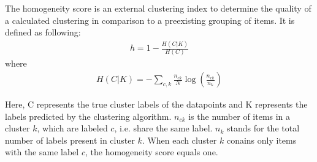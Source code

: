 The homogeneity score is an external clustering index to determine the quality of a calculated clustering in comparison to a preexisting grouping of items.
It is defined as following: \cite{rosenberg2007v}\\

\begin{align}
    h = 1 - \frac{H(C|K)}{H(C)}
\end{align}
where
\begin{align}
    H(C|K) = - \sum_{c,k} \frac{n_{ck}}{N}\log\left(\frac{n_{ck}}{n_k}\right)
\end{align}

Here, C represents the true cluster labels of the datapoints and K represents the labels predicted by the clustering algorithm. $n_{ck}$ is the number of items in a cluster $k$, which are labeled $c$, i.e. share the same label. $n_k$ stands for the total number of labels present in cluster $k$.
When each cluster $k$ conains only items with the same label $c$, the homogeneity score equals one.